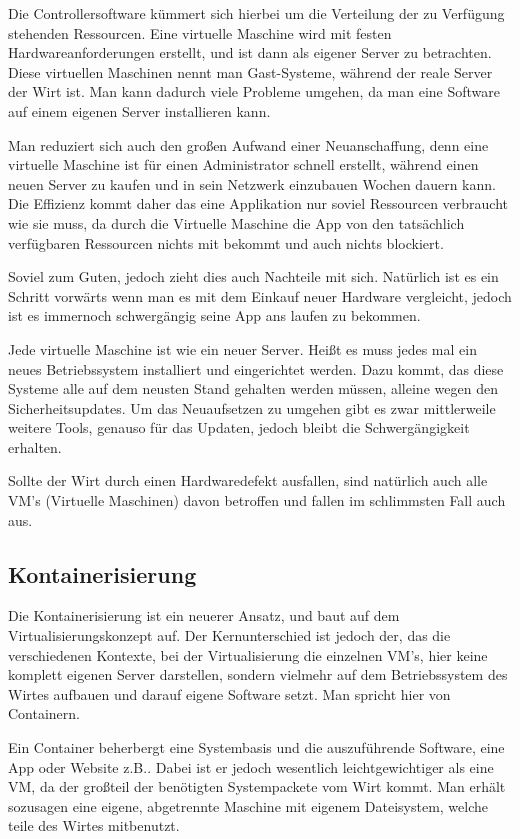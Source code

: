 Die Controllersoftware kümmert sich hierbei um die Verteilung der zu Verfügung stehenden Ressourcen. Eine virtuelle Maschine wird mit festen Hardwareanforderungen
erstellt, und ist dann als eigener Server zu betrachten.
Diese virtuellen Maschinen nennt man Gast-Systeme, während der reale Server der Wirt ist. Man kann dadurch viele Probleme umgehen, da man eine Software auf einem eigenen Server installieren kann.

Man reduziert sich auch den großen Aufwand einer Neuanschaffung, denn eine virtuelle Maschine ist für einen Administrator schnell erstellt, während einen neuen Server zu kaufen und in sein Netzwerk einzubauen Wochen dauern kann.
Die Effizienz kommt daher das eine Applikation nur soviel Ressourcen verbraucht wie sie muss, da durch die Virtuelle Maschine die App von den tatsächlich verfügbaren Ressourcen nichts mit bekommt und auch nichts blockiert.

Soviel zum Guten, jedoch zieht dies auch Nachteile mit sich.
Natürlich ist es ein Schritt vorwärts wenn man es mit dem Einkauf neuer Hardware vergleicht, jedoch ist es immernoch schwergängig seine App ans laufen zu bekommen.

Jede virtuelle Maschine ist wie ein neuer Server. Heißt es muss jedes mal ein neues Betriebssystem installiert und eingerichtet werden. Dazu kommt, das diese Systeme alle auf dem neusten Stand gehalten werden müssen,
alleine wegen den Sicherheitsupdates. Um das Neuaufsetzen zu umgehen gibt es zwar mittlerweile weitere Tools, genauso für das Updaten, jedoch bleibt die Schwergängigkeit erhalten.

Sollte der Wirt durch einen Hardwaredefekt ausfallen, sind natürlich auch alle VM's (Virtuelle Maschinen) davon betroffen und fallen im schlimmsten Fall auch aus.

\subsection{Kontainerisierung}
Die Kontainerisierung ist ein neuerer Ansatz, und baut auf dem Virtualisierungskonzept auf. Der Kernunterschied ist jedoch der, das die verschiedenen Kontexte, bei der Virtualisierung die einzelnen VM's,
hier keine komplett eigenen Server darstellen, sondern vielmehr auf dem Betriebssystem des Wirtes aufbauen und darauf eigene Software setzt. Man spricht hier von Containern.

Ein Container beherbergt eine Systembasis und die auszuführende Software, eine App oder Website z.B.. Dabei ist er jedoch wesentlich leichtgewichtiger als eine VM, 
da der großteil der benötigten Systempackete vom Wirt kommt. Man erhält sozusagen eine eigene, abgetrennte Maschine mit eigenem Dateisystem, welche teile des Wirtes mitbenutzt.

